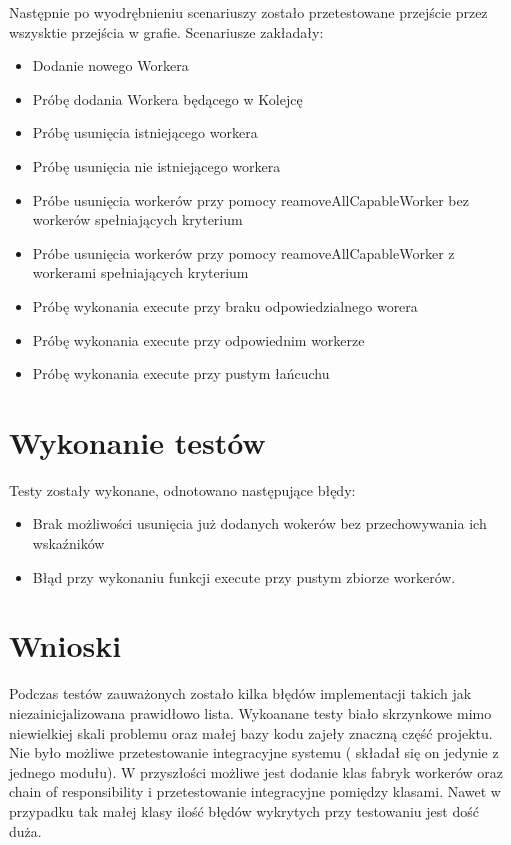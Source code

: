 \documentclass[paper=a4, fontsize=11pt]{scrartcl} %
\numberwithin{equation}{section} %
\numberwithin{figure}{section} %
\numberwithin{table}{section} %
\begin{document}
Następnie po wyodrębnieniu scenariuszy zostało przetestowane przejście przez wszysktie przejścia w grafie.
Scenariusze zakładały:

\begin{itemize}
  \item Dodanie nowego Workera
  \item Próbę dodania Workera będącego w Kolejcę
  \item Próbę usunięcia istniejącego workera
  \item Próbę usunięcia nie istniejącego workera
  \item Próbe usunięcia workerów przy pomocy reamoveAllCapableWorker bez workerów spełniających kryterium 
  \item Próbe usunięcia workerów przy pomocy reamoveAllCapableWorker z workerami spełniających kryterium 
  \item Próbę wykonania execute przy braku odpowiedzialnego worera
  \item Próbę wykonania execute przy odpowiednim workerze 
  \item Próbę wykonania execute przy pustym łańcuchu 
\end{itemize}

\section{Wykonanie testów}

Testy zostały wykonane, odnotowano następujące błędy:
\begin{itemize}
  \item Brak możliwości usunięcia już dodanych wokerów bez przechowywania ich wskaźników
  \item Błąd przy wykonaniu funkcji execute przy pustym zbiorze workerów.
\end{itemize}


\section{Wnioski }

Podczas testów zauważonych zostało kilka błędów implementacji takich jak niezainicjalizowana prawidłowo lista.
Wykoanane testy biało skrzynkowe mimo niewielkiej skali problemu oraz małej bazy kodu zajeły znaczną część projektu.
Nie było możliwe przetestowanie integracyjne systemu ( składał się on jedynie z jednego modułu). W przyszłości 
możliwe jest dodanie klas fabryk workerów oraz chain of responsibility i przetestowanie integracyjne pomiędzy klasami.
Nawet w przypadku tak małej klasy ilość błędów wykrytych przy testowaniu jest dość duża.
\end{document}
